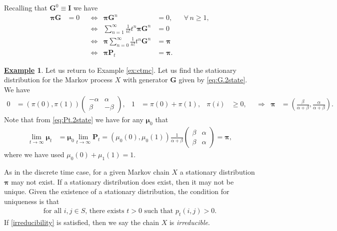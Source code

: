 \documentclass[12pt]{book}
\numberwithin{equation}{chapter}
\theoremstyle{plain}
\numberwithin{theorem}{section}
\theoremstyle{definition}
\newtheorem{example}[theorem]{\underline{Example}}
\numberwithin{exercise}{chapter}
\let\oldendproof\endproof
\renewenvironment{proof}[1][\proofname]{%
  \oldproof[\scshape\underline{#1}]%
}{\oldendproof}
\newcommand{\<}{\langle}
\renewcommand{\>}{\rangle}
\renewcommand{\(}{\left(}
\renewcommand{\)}{\right)}
\renewcommand{\[}{\left[}
\renewcommand{\]}{\right]}
\newcommand\Gv{\pmb{G}}
\newcommand\Iv{\pmb{I}}
\newcommand\Pv{\pmb{P}}
\newcommand\muv{\pmb{\mu}}
\newcommand\piv{\pmb{\pi}}
\begin{document}
\begin{proof}
Recalling that $\Gv^0 \equiv \Iv$ we have
\begin{align}
\piv \Gv
	&=	0 &
	&\Leftrightarrow&
\piv \Gv^n
	&=	0 , &
	&		\forall \, n \geq 1 , \\ & & &\Leftrightarrow&
\sum_{n=1}^\infty \frac{1}{n!} t^n \piv \Gv^n
	&=	0 \\ & & &\Leftrightarrow&
\piv  \sum_{n=0}^\infty \frac{1}{n!} t^n \Gv^n
	&=	\piv \\ & & &\Leftrightarrow&
\piv \Pv_t
	&=	\piv .
\end{align}
\end{proof}

\begin{example}
Let us return to Example \ref{ex:ctmc}.  Let us find the stationary distribution for the Markov process $X$ with generator $\Gv$ given by \eqref{eq:G.2state}.  We have
\begin{align}
0
	&=	\( \pi(0) , \pi(1) \) \( \begin{array}{cc}
			-\alpha & \alpha \\
			\beta & -\beta
			\end{array} \) , &
1
	&= \pi(0) + \pi(1) , &
\pi(i)
	&\geq 0 , &
	&\Rightarrow&
\piv
	&=  \(  \frac{\beta}{\alpha + \beta} ,  \frac{\alpha}{\alpha + \beta} \) .
\end{align}
Note that from \eqref{eq:Pt.2state} we have for any $\muv_0$ that
\begin{align}
\lim_{t \to \infty} \muv_t
	&=		\muv_0 \lim_{t \to \infty} \Pv_t
	=		\( \mu_0(0) , \mu_0(1) \) 
				\frac{1}{\alpha + \beta} 
				\( \begin{array}{cc}
				\beta  & \alpha  \\
				\beta  & \alpha
				\end{array} \)
	=		\piv ,
\end{align}
where we have used $\mu_0(0) + \mu_1(1) = 1 $.
\end{example}

\noindent
As in the discrete time case, for a given Markov chain $X$ a stationary distribution $\piv$ may not exist.  If a stationary distribution does exist, then it may not be unique.  Given the existence of a stationary distribution, the condition for uniqueness is that
\begin{align}
\text{for all $i,j \in S$, there exists $t>0$ such that  $p_t(i,j)>0$.} \label{irreducibility}
\end{align} 
If \eqref{irreducibility} is satisfied, then we say the chain $X$ is \emph{irreducible}.
\end{document}
